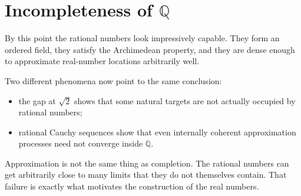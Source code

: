 
\section{Incompleteness of $\mathbb{Q}$}
\label{sec:incompleteness-q}

By this point the rational numbers look impressively capable. They form
an ordered field, they satisfy the Archimedean property, and they are
dense enough to approximate real-number locations arbitrarily well.

\begin{remark}
Two different phenomena now point to the same conclusion:
\begin{itemize}
  \item the gap at $\sqrt{2}$ shows that some natural targets are not
        actually occupied by rational numbers;
  \item rational Cauchy sequences show that even internally coherent
        approximation processes need not converge inside $\mathbb{Q}$.
\end{itemize}
\end{remark}

\begin{remark}
Approximation is not the same thing as completion. The rational numbers
can get arbitrarily close to many limits that they do not themselves
contain. That failure is exactly what motivates the construction of the
real numbers.
\end{remark}
